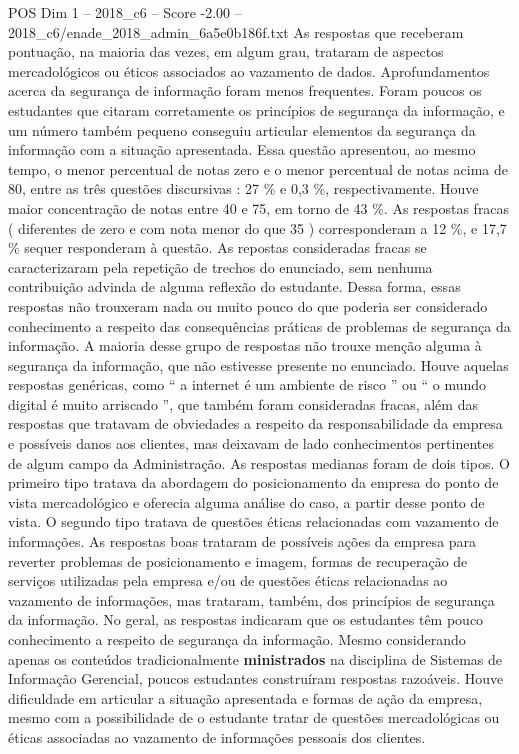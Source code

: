 \begin{textsample}{POS Dim 1 – 2018\_c6 – Score -2.00 – 2018\_c6/enade\_2018\_admin\_6a5e0b186f.txt}
As respostas que receberam pontuação, na maioria das vezes, em algum grau, trataram de aspectos mercadológicos ou éticos associados ao vazamento de dados.
Aprofundamentos acerca da segurança de informação foram menos frequentes.
Foram poucos os estudantes que citaram corretamente os princípios de segurança da informação, e um número também pequeno conseguiu articular elementos da segurança da informação com a situação apresentada.
Essa questão apresentou, ao mesmo tempo, o menor percentual de notas zero e o menor percentual de notas acima de 80, entre as três questões discursivas : 27 \% e 0,3 \%, respectivamente.
Houve maior concentração de notas entre 40 e 75, em torno de 43 \%.
As respostas fracas ( diferentes de zero e com nota menor do que 35 ) corresponderam a 12 \%, e 17,7 \% sequer responderam à questão.
As repostas consideradas fracas se caracterizaram pela repetição de trechos do enunciado, sem nenhuma contribuição advinda de alguma reflexão do estudante.
Dessa forma, essas respostas não trouxeram nada ou muito pouco do que poderia ser considerado conhecimento a respeito das consequências práticas de problemas de segurança da informação.
A maioria desse grupo de respostas não trouxe menção alguma à segurança da informação, que não estivesse presente no enunciado.
Houve aquelas respostas genéricas, como “ a internet é um ambiente de risco ” ou “ o mundo digital é muito arriscado ”, que também foram consideradas fracas, além das respostas que tratavam de obviedades a respeito da responsabilidade da empresa e possíveis danos aos clientes, mas deixavam de lado conhecimentos pertinentes de algum campo da Administração.
As respostas medianas foram de dois tipos.
O primeiro tipo tratava da abordagem do posicionamento da empresa do ponto de vista mercadológico e oferecia alguma análise do caso, a partir desse ponto de vista.
O segundo tipo tratava de questões éticas relacionadas com vazamento de informações.
As respostas boas trataram de possíveis ações da empresa para reverter problemas de posicionamento e imagem, formas de recuperação de serviços utilizadas pela empresa e/ou de questões éticas relacionadas ao vazamento de informações, mas trataram, também, dos princípios de segurança da informação.
No geral, as respostas indicaram que os estudantes têm pouco conhecimento a respeito de segurança da informação.
Mesmo considerando apenas os conteúdos tradicionalmente \textbf{ministrados} na disciplina de Sistemas de Informação Gerencial, poucos estudantes construíram respostas razoáveis.
Houve dificuldade em articular a situação apresentada e formas de ação da empresa, mesmo com a possibilidade de o estudante tratar de questões mercadológicas ou éticas associadas ao vazamento de informações pessoais dos clientes.

\end{textsample}
